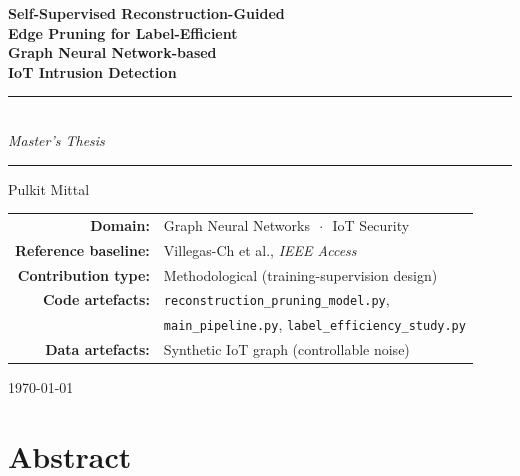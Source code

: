 \documentclass[11pt,a4paper]{report}
\theoremstyle{definition}
\theoremstyle{remark}
\begin{document}
\begin{titlepage}
\centering
\vspace*{1.5cm}

{\Large\bfseries Self-Supervised Reconstruction-Guided\\[0.3em]
Edge Pruning for Label-Efficient\\[0.3em]
Graph Neural Network-based\\[0.3em]
IoT Intrusion Detection\par}

\vspace{2.0cm}
\rule{0.7\textwidth}{0.5pt}\\[1ex]
{\large \textit{Master's Thesis}}\\[1ex]
\rule{0.7\textwidth}{0.5pt}

\vspace{1.5cm}
{\large Pulkit Mittal \par}

\vspace{2cm}

\begin{tabular}{rl}
\textbf{Domain:}            & Graph Neural Networks $\,\cdot\,$ IoT Security \\
\textbf{Reference baseline:}& Villegas-Ch et al., \emph{IEEE Access} \\
\textbf{Contribution type:} & Methodological (training-supervision design) \\
\textbf{Code artefacts:}    & \texttt{reconstruction\_pruning\_model.py}, \\
                            & \texttt{main\_pipeline.py},
                              \texttt{label\_efficiency\_study.py} \\
\textbf{Data artefacts:}    & Synthetic IoT graph (controllable noise) \\
\end{tabular}

\vfill
{\large \today \par}
\end{titlepage}

\chapter*{Abstract}
\end{document}

